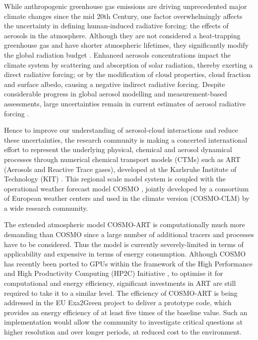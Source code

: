 While anthropogenic greenhouse gas emissions are driving unprecedented
major  climate  changes  since   the  mid  20th  Century,  one  factor
overwhelmingly  affects  the  uncertainty  in  defining  human-induced
radiative  forcing:  the  effects   of  aerosols  in  the  atmosphere.
Although they  are not considered  a heat-trapping greenhouse  gas and
have  shorter  atmospheric lifetimes,  they  significantly modify  the
global   radiation   budget   \citep{IPCC-2013}.   Enhanced   aerosols
concentrations impact the climate  system by scattering and absorption
of solar radiation, thereby exerting a direct radiative forcing; or by
the  modification  of cloud  properties,  cloud  fraction and  surface
albedo,  causing  a  negative  indirect  radiative  forcing.   Despite
considerable  progress in  global aerosol  modelling \citep{Mann-2013}
and  measurement-based  assessments,  large  uncertainties  remain  in
current  estimates  of  aerosol radiative  forcing  \citep{Myhre-2013,
IPCC-2013,  Lee-2013,   Randles-2013,  Rosenfeld-2013,  Sherwood-2013,
Stier-2013}.

Hence to  improve our understanding of  aerosol-cloud interactions and
reduce  these  uncertainties,  the  research  community  is  making  a
concerted international  effort to represent  the underlying physical,
chemical  and aerosol dynamical  processes through  numerical chemical
transport  models (CTMs)  such  as ART  (Aerosols  and Reactive  Trace
gases),   developed   at  the   Karlsruhe   Institute  of   Technology
(KIT)  \citep{Vogel-2009,  Bangert-2011,  Knote-2013}.  This  regional
scale model  system is coupled  with the operational  weather forecast
model COSMO \citep{Baldauf-2011}, jointly developed by a consortium of
European weather  centers and used in the  climate version (COSMO-CLM)
by a wide research community.

The extended atmospheric model  COSMO-ART is computationally much more
demanding than  COSMO since a  large number of additional  tracers and
processes  have  to  be  considered.   Thus  the  model  is  currently
severely-limited in  terms of applicability and expensive  in terms of
energy  consumption.   Although  COSMO  has recently  been  ported  to
GPUs  \citep{Gysi-2014, Lapillonne-2014} within  the framework  of the
High    Performance   and    High   Productivity    Computing   (HP2C)
Initiative \citep{HP2C},  to optimise it for  computational and energy
efficiency, significant investments in  ART are still required to take
it to a similar level.  The efficiency of COSMO-ART is being addressed
in the  EU Exa2Green project \citep{EXA2GREEN} to  deliver a prototype
code, which  provides an energy efficiency  of at least  five times of
the baseline value.  Such  an implementation would allow the community
to investigate critical questions at higher resolution and over longer
periods, at reduced cost to the environment.

